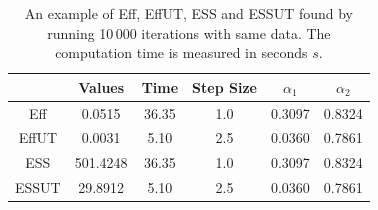 \begin{table}[h]
\centering
\begin{tabular}{|c|c|c|c|c|c|}
\hline
          & Values     & Time & Step Size & $\alpha_1$ & $\alpha_2$ \\ \hline
Eff      & 0.0515     & 36.35 & 1.0   & 0.3097    & 0.8324    \\ \hline
EffUT  & 0.0031     & 5.10   & 2.5   & 0.0360   & 0.7861   \\ \hline
ESS     & 501.4248 & 36.35 & 1.0   & 0.3097    & 0.8324     \\ \hline
ESSUT & 29.8912   & 5.10   & 2.5   & 0.0360   & 0.7861    \\ \hline
\end{tabular}
\caption{An example of Eff, EffUT, ESS and ESSUT found by running 10\,000 iterations with same data. The computation time is measured in seconds $s$. }
\label{effeutessessutexampletable}
\end{table}

